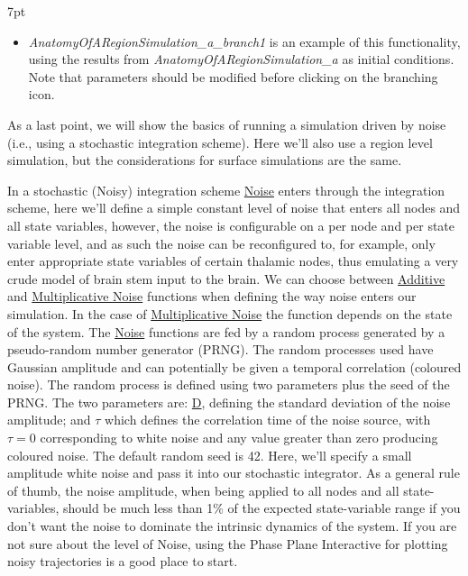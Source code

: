 \documentclass{tufte-handout}
\newenvironment{simulation}{%
  \def\FrameCommand{%
    \hspace{1pt}%
    {\color{ForestGreen}\vrule width 2pt}%
    {\color{simulationshade}\vrule width 4pt}%
    \colorbox{simulationshade}%
  }%
  \MakeFramed{\advance\hsize-\width\FrameRestore}%
  \noindent\hspace{-4.55pt}%
  \begin{adjustwidth}{}{7pt}%
  \vspace{2pt}\vspace{2pt}%
}
{%
  \vspace{2pt}\end{adjustwidth}\endMakeFramed%
}
\begin{document}
\begin{simulation}
\begin{itemize}
 \item \textit{AnatomyOfARegionSimulation\_a\_branch1} is an example of this functionality, using the results from \textit{AnatomyOfARegionSimulation\_a} as initial conditions. Note that parameters should be modified before clicking on the branching icon.
\end{itemize}
\end{simulation}



As a last point, we will  show the basics of running a simulation driven by
noise (i.e., using a stochastic integration scheme). Here we'll also use a region
level simulation, but the considerations for surface simulations are the same.

In a stochastic (Noisy) integration scheme \underline{Noise} enters through the integration
scheme, here we'll define a simple constant level of noise that enters all
nodes and all state variables, however, the noise is configurable on a per
node and per state variable level, and as such the noise can be reconfigured
to, for example, only enter appropriate state variables of certain thalamic
nodes, thus emulating a very crude model of brain stem input to the brain. We
can choose between \underline{Additive} and \underline{Multiplicative Noise} functions when defining
the way noise enters our simulation. In the case of \underline{Multiplicative Noise} the
function depends on the state of the system. The \underline{Noise} functions are fed by a
random process generated by a pseudo-random number generator (PRNG). The random
processes used have Gaussian amplitude and can potentially be given a temporal
correlation (coloured noise). The random process is defined using two
parameters plus the seed of the PRNG. The two parameters are: \underline{D}, defining the
standard deviation of the noise amplitude; and \underline{$\tau$} which defines the
correlation time of the noise source, with $\tau = 0$ corresponding to white
noise and any value greater than zero producing coloured noise. The default
random seed is 42. Here, we'll specify a small amplitude white noise and pass
it into our stochastic integrator. As a general rule of thumb, the noise
amplitude, when being applied to all nodes and all state-variables, should be
much less than 1\% of the expected state-variable range if you don't want the
noise to dominate the intrinsic dynamics of the system.
If you are not sure about the level of Noise, using the Phase Plane
Interactive for plotting noisy trajectories is a good place to start.
\end{document}
